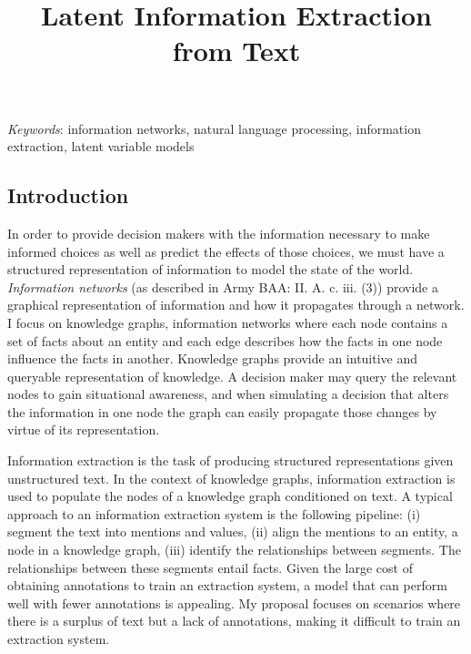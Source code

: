 \documentclass[12pt]{article}
\title{Latent Information Extraction from Text}
\date{}
\begin{document}
\maketitle{}

\vspace{-2cm}

{\small \textit{Keywords}:
information networks, natural language processing, information extraction, latent variable models }
\subsection*{Introduction}

In order to provide decision makers with the information
necessary to make informed choices as well as predict the effects of those choices,
we must have a structured representation of information to model the state of the world. \textit{Information networks} (as described in Army BAA: II. A. c. iii. (3)) provide a graphical representation of information and how it
propagates through a network.
I focus on knowledge graphs, information networks where each node contains a set of facts
about an entity and each edge describes how the facts in one node influence the facts in another.
Knowledge graphs provide an intuitive and queryable representation of knowledge.
A decision maker may query the relevant nodes to gain situational awareness, and
when simulating a decision that alters the information in one node
the graph can easily propagate those changes by virtue of its representation.


Information extraction is the task of producing structured representations given unstructured text.
In the context of knowledge graphs,
information extraction is used to populate the nodes of
a knowledge graph conditioned on text.
A typical approach to an information extraction system is the following pipeline:
(i) segment the text into mentions and values, (ii) align the mentions to an entity, a node in a knowledge graph, (iii) identify the relationships between segments.
The relationships between these segments entail facts. Given the large cost of obtaining annotations to train an extraction system,
a model that can perform well with fewer annotations is appealing.
My proposal focuses on scenarios where there is a surplus of text but a lack of annotations,
making it difficult to train an extraction system.
\end{document}

